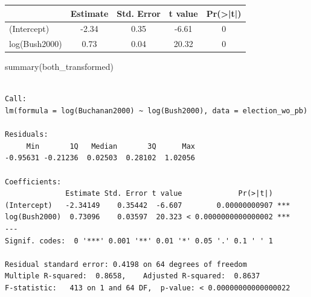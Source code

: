 \documentclass[
  letterpaper,
  DIV=11,
  numbers=noendperiod]{scrartcl}
\newenvironment{Shaded}{\begin{snugshade}}{\end{snugshade}}
\newcommand{\AttributeTok}[1]{\textcolor[rgb]{0.40,0.45,0.13}{#1}}
\newcommand{\CommentTok}[1]{\textcolor[rgb]{0.37,0.37,0.37}{#1}}
\newcommand{\DecValTok}[1]{\textcolor[rgb]{0.68,0.00,0.00}{#1}}
\newcommand{\FunctionTok}[1]{\textcolor[rgb]{0.28,0.35,0.67}{#1}}
\newcommand{\NormalTok}[1]{\textcolor[rgb]{0.00,0.23,0.31}{#1}}
\newcommand{\OtherTok}[1]{\textcolor[rgb]{0.00,0.23,0.31}{#1}}
\newcommand{\SpecialCharTok}[1]{\textcolor[rgb]{0.37,0.37,0.37}{#1}}
\newcommand{\StringTok}[1]{\textcolor[rgb]{0.13,0.47,0.30}{#1}}
\begin{document}
\begin{Shaded}
\end{Shaded}

\begin{table}[H]
\centering
\begin{tabular}[t]{lcccc}
\toprule
  & Estimate & Std. Error & t value & Pr(>|t|)\\
\midrule
(Intercept) & -2.34 & 0.35 & -6.61 & 0\\
log(Bush2000) & 0.73 & 0.04 & 20.32 & 0\\
\bottomrule
\end{tabular}
\end{table}

\begin{Shaded}
\begin{Highlighting}[]
\FunctionTok{summary}\NormalTok{(both\_transformed)}
\end{Highlighting}
\end{Shaded}

\begin{verbatim}

Call:
lm(formula = log(Buchanan2000) ~ log(Bush2000), data = election_wo_pb)

Residuals:
     Min       1Q   Median       3Q      Max 
-0.95631 -0.21236  0.02503  0.28102  1.02056 

Coefficients:
              Estimate Std. Error t value             Pr(>|t|)    
(Intercept)   -2.34149    0.35442  -6.607        0.00000000907 ***
log(Bush2000)  0.73096    0.03597  20.323 < 0.0000000000000002 ***
---
Signif. codes:  0 '***' 0.001 '**' 0.01 '*' 0.05 '.' 0.1 ' ' 1

Residual standard error: 0.4198 on 64 degrees of freedom
Multiple R-squared:  0.8658,    Adjusted R-squared:  0.8637 
F-statistic:   413 on 1 and 64 DF,  p-value: < 0.00000000000000022
\end{verbatim}
\end{document}
